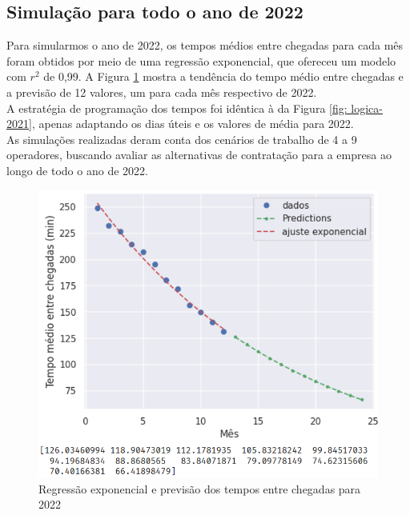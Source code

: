 \subsection{Simulação para todo o ano de 2022}
\label{section: sim-2022}
Para simularmos o ano de 2022, os tempos médios entre chegadas para cada mês foram obtidos por meio de uma regressão exponencial, que ofereceu um modelo com $r^2$ de 0,99. A Figura \ref*{fig: regressao-expo-2022} mostra a tendência do tempo médio entre chegadas e a previsão de 12 valores, um para cada mês respectivo de 2022.\\
A estratégia de programação dos tempos foi idêntica à da Figura \ref*{fig: logica-2021}, apenas adaptando os dias úteis e os valores de média para 2022.\\
As simulações realizadas deram conta dos cenários de trabalho de 4 a 9 operadores, buscando avaliar as alternativas de contratação para a empresa ao longo de todo o ano de 2022.

\begin{figure}[H]
    \centering
    \includegraphics[scale=1]{simulacao/regressao-expo-2022.png}
    \caption{Regressão exponencial e previsão dos tempos entre chegadas para 2022}
    \label{fig: regressao-expo-2022}
\end{figure}
